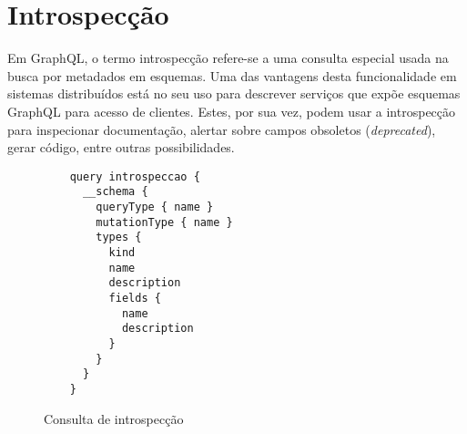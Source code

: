 \section[Introspecção]{Introspecção}

Em GraphQL, o termo introspecção refere-se a uma consulta especial usada na busca por metadados em esquemas. Uma das vantagens desta funcionalidade em sistemas distribuídos está no seu uso para descrever serviços que expõe esquemas GraphQL para acesso de clientes. Estes, por sua vez, podem usar a introspecção para inspecionar documentação, alertar sobre campos obsoletos (\textit{deprecated}), gerar código, entre outras possibilidades.

\begin{figure}[H]
  \centering
  \begin{verbatim}
    query introspeccao {
      __schema {
        queryType { name }
        mutationType { name }
        types {
          kind
          name
          description
          fields {
            name
            description
          }
        }
      }
    }
  \end{verbatim}
  \caption{Consulta de introspecção}
\end{figure}
